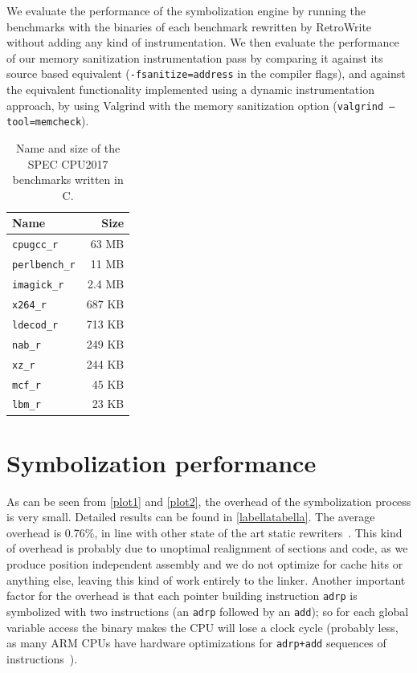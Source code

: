 \documentclass[a4paper,11pt,oneside]{report}
\newcommand{\sysname}{RetroWrite\xspace}
\begin{document}
We evaluate the performance of the symbolization engine by running the benchmarks
with the binaries of each benchmark rewritten by \sysname without adding any kind
of instrumentation. We then evaluate the performance of our memory sanitization
instrumentation pass by comparing it against its source based equivalent (\texttt{-fsanitize=address} in the compiler flags), and against the equivalent functionality implemented
using a dynamic instrumentation approach, by using Valgrind with the memory sanitization
option (\texttt{valgrind --tool=memcheck}).


\begin{table}
\centering
\begin{tabular}{lr}
\toprule
	\textbf{Name} & \textbf{Size}\\
\toprule
\texttt{cpugcc\_r   } & 63 MB\\
\texttt{perlbench\_r} \hspace{2em} &   11 MB \\
\texttt{imagick\_r  } & 2.4 MB\\
\texttt{x264\_r } &  687 KB\\
\texttt{ldecod\_r   } & 713 KB\\
\texttt{nab\_r      } & 249 KB\\
\texttt{xz\_r   } &  244 KB \\
\texttt{mcf\_r      } & 45 KB\\
\texttt{lbm\_r      } & 23 KB \\
\bottomrule
\end{tabular}
\caption{Name and size of the SPEC CPU2017 benchmarks written in C.}
\label{tabularasa}
\end{table}

\section{Symbolization performance}

As can be seen from \autoref{plot1} and \autoref{plot2}, the overhead of the
symbolization process is very small. Detailed results can be found in
\autoref{labellatabella}.  The average overhead is 0.76\%, in line with other
state of the art static rewriters~\cite{egalito}.  This kind of overhead is
probably due to unoptimal realignment of sections and code, as we produce
position independent assembly and we do not optimize for cache hits or anything
else, leaving this kind of work entirely to the linker. Another important
factor for the overhead is that each pointer building instruction \texttt{adrp}
is symbolized with two instructions (an \texttt{adrp} followed by an
\texttt{add}); so for each global variable access the binary makes the CPU will
lose a clock cycle (probably less, as many ARM CPUs have hardware optimizations
for \texttt{adrp+add} sequences of instructions~\cite{pointeroptimizations}).
\end{document}
